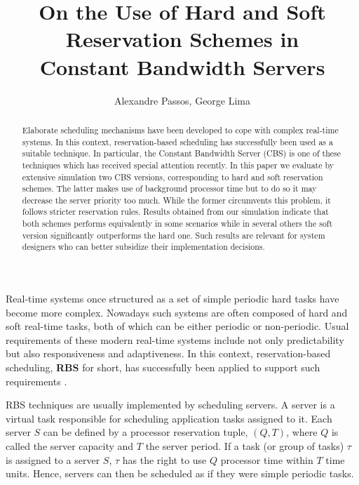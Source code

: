 \documentclass[times, 10pt,twocolumn]{article}
\author{Alexandre Passos, George Lima}
\title{On the Use of Hard and Soft Reservation Schemes in \\ Constant Bandwidth Servers}
\begin{document}
\graphicspath{{figs/}{data/}}

\maketitle

\begin{abstract}

  Elaborate scheduling mechanisms have been developed to cope with
  complex real-time systems. In this context, reservation-based
  scheduling has successfully been used as a suitable technique. In
  particular, the Constant Bandwidth Server (CBS) is one of these
  techniques which has received special attention recently.  In this
  paper we evaluate by extensive simulation two CBS versions,
  corresponding to hard and soft reservation schemes.  The latter
  makes use of background processor time but to do so it may decrease
  the server priority too much.  While the former circumvents this
  problem, it follows stricter reservation rules.  Results obtained
  from our simulation indicate that both schemes performs equivalently
  in some scenarios while in several others the soft version
  significantly outperforms the hard one. Such results are relevant
  for system designers who can better subsidize their implementation
  decisions.

\end{abstract}

\label{sec:introduction}

Real-time systems once structured as a set of
simple periodic hard tasks \cite{liu.ea73:scheduling} have become more
complex. Nowadays such systems are often composed of hard and soft
real-time tasks, both of which can be either periodic or non-periodic.
Usual requirements of these modern real-time systems include not only
predictability but also responsiveness and adaptiveness. In this
context, reservation-based scheduling, \textbf{RBS} for short, has
successfully been applied to support such requirements
\cite{abeni.ea04:resource,mercer.ea94:processor,rajkumar.ea98:resource,sprunt.ea89:aperiodic,steffens.ea03:resource}.

RBS techniques are usually implemented by scheduling servers. A server
is a virtual task responsible for scheduling application tasks
assigned to it.  Each server $S$ can be defined by a processor
reservation tuple, $(Q,T)$, where $Q$ is called the server
capacity and $T$ the server period.  If a task (or group of tasks)
$\tau$ is assigned to a server $S$, $\tau$ has the right to use
$Q$ processor time within $T$ time units. Hence, servers can then
be scheduled as if they were simple periodic tasks.
\end{document}
